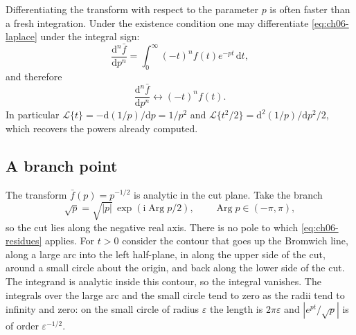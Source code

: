 Differentiating the transform with respect to the parameter $p$ is often faster than a fresh integration. Under the existence condition one may differentiate \eqref{eq:ch06-laplace} under the integral sign:
\begin{equation}
\frac{\mathrm{d}^n\bar f}{\mathrm{d}p^n}
=\int_0^{\infty}(-t)^n f(t)e^{-pt}\,\mathrm{d}t,
\end{equation}
and therefore
\begin{equation}
\frac{\mathrm{d}^n\bar f}{\mathrm{d}p^n}\longleftrightarrow(-t)^n f(t).
\label{eq:ch06-p-derivative}
\end{equation}
In particular $\mathcal{L}\{t\}=-\mathrm{d}(1/p)/\mathrm{d}p=1/p^2$ and $\mathcal{L}\{t^2/2\}=\mathrm{d}^2(1/p)/\mathrm{d}p^2\big/2$, which recovers the powers already computed.

\subsection{A branch point}

The transform $\bar f(p)=p^{-1/2}$ is analytic in the cut plane. Take the branch
\begin{equation}
\sqrt{p}=\sqrt{|p|}\,\exp(\mathrm{i}\operatorname{Arg}p/2),
\qquad\operatorname{Arg}p\in(-\pi,\pi),
\end{equation}
so the cut lies along the negative real axis. There is no pole to which \eqref{eq:ch06-residues} applies. For $t>0$ consider the contour that goes up the Bromwich line, along a large arc into the left half-plane, in along the upper side of the cut, around a small circle about the origin, and back along the lower side of the cut. The integrand is analytic inside this contour, so the integral vanishes. The integrals over the large arc and the small circle tend to zero as the radii tend to infinity and zero: on the small circle of radius $\varepsilon$ the length is $2\pi\varepsilon$ and $|e^{pt}/\sqrt{p}|$ is of order $\varepsilon^{-1/2}$.

